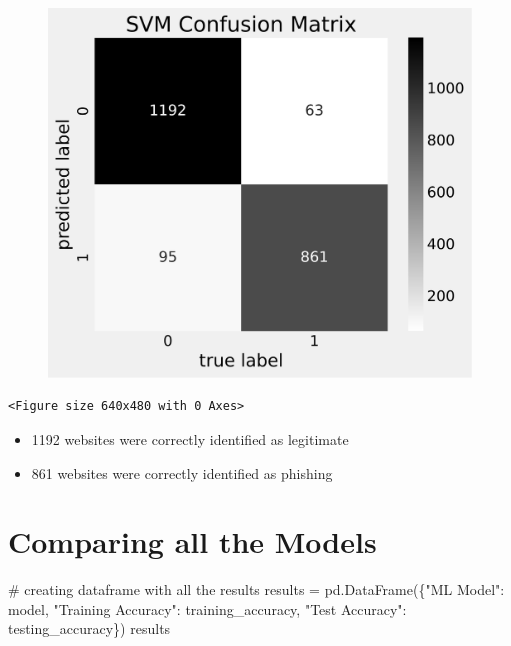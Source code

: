\documentclass[
  letterpaper,
  DIV=11,
  numbers=noendperiod]{scrartcl}
\newenvironment{Shaded}{\begin{snugshade}}{\end{snugshade}}
\newcommand{\CommentTok}[1]{\textcolor[rgb]{0.37,0.37,0.37}{#1}}
\newcommand{\NormalTok}[1]{\textcolor[rgb]{0.00,0.23,0.31}{#1}}
\newcommand{\OperatorTok}[1]{\textcolor[rgb]{0.37,0.37,0.37}{#1}}
\newcommand{\StringTok}[1]{\textcolor[rgb]{0.13,0.47,0.30}{#1}}
\providecommand{\tightlist}{%
  \setlength{\itemsep}{0pt}\setlength{\parskip}{0pt}}\usepackage{longtable,booktabs,array}
\begin{document}
\begin{figure}[H]

{\centering \includegraphics{project_files/figure-pdf/cell-41-output-1.svg}

}

\end{figure}

\begin{verbatim}
<Figure size 640x480 with 0 Axes>
\end{verbatim}

\begin{itemize}
\tightlist
\item
  1192 websites were correctly identified as legitimate
\item
  861 websites were correctly identified as phishing
\end{itemize}

\hypertarget{comparing-all-the-models}{%
\section{Comparing all the Models}\label{comparing-all-the-models}}

\begin{Shaded}
\begin{Highlighting}[]
\CommentTok{\# creating dataframe with all the results}
\NormalTok{results }\OperatorTok{=}\NormalTok{ pd.DataFrame(\{}\StringTok{"ML Model"}\NormalTok{: model, }\StringTok{"Training Accuracy"}\NormalTok{: training\_accuracy, }\StringTok{"Test Accuracy"}\NormalTok{: testing\_accuracy\})}
\NormalTok{results}
\end{Highlighting}
\end{Shaded}
\end{document}
